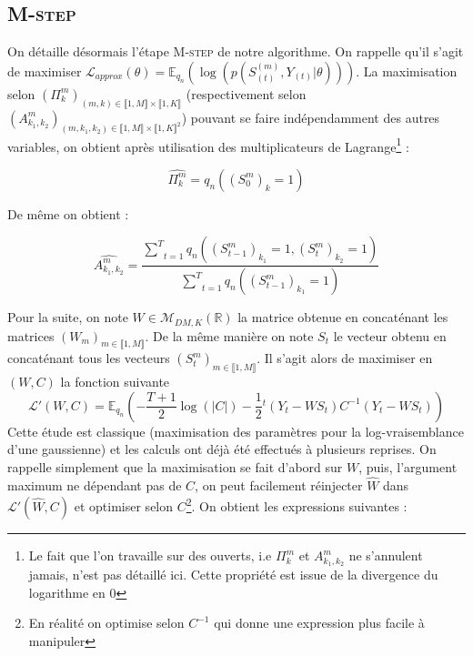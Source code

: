 \documentclass[10pt,a4paper]{article}
\newcommand{\Mstep}{\textsc{M-step}}
\begin{document}
\subsection{\Mstep{}\label{app:mstep}}

On détaille désormais l'étape \Mstep{} de notre algorithme.
On rappelle qu'il s'agit de maximiser
$\mathcal{L}_{approx}(\theta)=\mathbb{E}_{q_n}
\left( \log \left( p(S_{(t)}^{(m)},Y_{(t)}\vert \theta)\right)\right)$.
La maximisation selon
$(\Pi_{k}^m)_{(m,k) \in
\llbracket 1,M \rrbracket \times \llbracket 1,K \rrbracket}$
(respectivement selon
$(A_{k_1,k_2}^m)_{(m,k_1,k_2) \in
\llbracket 1,M \rrbracket \times \llbracket 1,K \rrbracket^2}$) pouvant se faire 
indépendamment des autres variables, on obtient après utilisation des 
multiplicateurs de Lagrange\footnote{Le fait que l'on travaille sur des 
ouverts, i.e $\Pi_{k}^m$ et $A_{k_1,k_2}^m$ ne s'annulent jamais, n'est pas 
détaillé ici. Cette propriété est issue de la divergence du logarithme en $0$} :

\begin{equation}
  \widehat{\Pi_k^m}=q_{n}((S_0^m)_k=1)
\end{equation}

De même on obtient :

\begin{equation}
  \widehat{A_{k_1,k_2}^m}=\frac{\underset{t=1}{\overset{T}{\sum}}q_n((S_{t-1}^m)_{
  k_1}=1,(S_t^m)_{k_2}=1)}{\underset{t=1}{\overset{T}{\sum}}q_n((S_{t-1}^m)_{k_1}
  =1)}
\end{equation}

  Pour la suite, on note $W \in \mathcal{M}_{DM,K}(\mathbb{R})$ la matrice 
obtenue en concaténant les matrices $(W_m)_{m \in \llbracket 1,M \rrbracket}$. 
De la même manière on note $S_t$ le vecteur obtenu en concaténant tous les 
vecteurs $(S_t^m)_{m \in \llbracket 1,M \rrbracket}$.
Il s'agit alors de maximiser en $(W,C)$ la fonction suivante 
\[ \mathcal{L}'(W,C)=\mathbb{E}_{q_n}\left(-\frac{T+1}{2} \log(\vert C \vert) 
-\frac{1}{2} {}^t\left(Y_t-WS_t \right)C^{-1} \left( Y_t-WS_t\right)\right) \]
Cette étude est classique (maximisation des paramètres pour la 
log-vraisemblance d'une gaussienne) et les calculs ont déjà été effectués à 
plusieurs reprises.
On rappelle simplement que la maximisation se fait d'abord sur $W$, puis,
l'argument maximum ne dépendant pas de $C$, on peut facilement réinjecter
$\widehat{W}$ dans $\mathcal{L}'(\widehat{W},C)$ et optimiser selon
$C$\footnote{En réalité on optimise selon $C^{-1}$ qui donne une 
expression plus facile à manipuler}.
On obtient les expressions suivantes :
\end{document}
